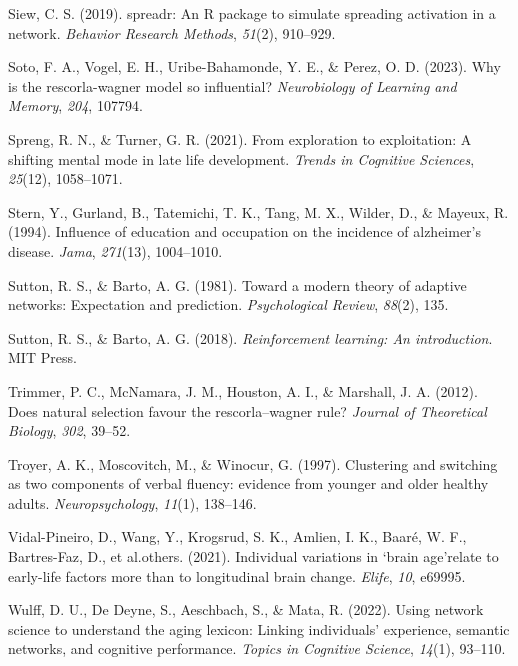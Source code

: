 \documentclass[
  man,floatsintext]{apa6}
\newlength{\cslhangindent}
\newlength{\cslentryspacingunit} %
\newenvironment{CSLReferences}[2] %
 {%
  \setlength{\parindent}{0pt}
  \ifodd #1
  \let\oldpar\par
  \def\par{\hangindent=\cslhangindent\oldpar}
  \fi
  \setlength{\parskip}{#2\cslentryspacingunit}
 }%
 {}
\begin{document}
\begin{CSLReferences}{1}{0}
\leavevmode{}%
Siew, C. S. (2019). {spreadr: An R package to simulate spreading activation in a network}. \emph{Behavior Research Methods}, \emph{51}(2), 910--929.

\leavevmode{}%
Soto, F. A., Vogel, E. H., Uribe-Bahamonde, Y. E., \& Perez, O. D. (2023). Why is the rescorla-wagner model so influential? \emph{Neurobiology of Learning and Memory}, \emph{204}, 107794.

\leavevmode{}%
Spreng, R. N., \& Turner, G. R. (2021). From exploration to exploitation: A shifting mental mode in late life development. \emph{Trends in Cognitive Sciences}, \emph{25}(12), 1058--1071.

\leavevmode{}%
Stern, Y., Gurland, B., Tatemichi, T. K., Tang, M. X., Wilder, D., \& Mayeux, R. (1994). Influence of education and occupation on the incidence of alzheimer's disease. \emph{Jama}, \emph{271}(13), 1004--1010.

\leavevmode{}%
Sutton, R. S., \& Barto, A. G. (1981). Toward a modern theory of adaptive networks: Expectation and prediction. \emph{Psychological Review}, \emph{88}(2), 135.

\leavevmode{}%
Sutton, R. S., \& Barto, A. G. (2018). \emph{Reinforcement learning: An introduction}. MIT Press.

\leavevmode{}%
Trimmer, P. C., McNamara, J. M., Houston, A. I., \& Marshall, J. A. (2012). Does natural selection favour the rescorla--wagner rule? \emph{Journal of Theoretical Biology}, \emph{302}, 39--52.

\leavevmode{}%
Troyer, A. K., Moscovitch, M., \& Winocur, G. (1997). {Clustering and switching as two components of verbal fluency: evidence from younger and older healthy adults.} \emph{Neuropsychology}, \emph{11}(1), 138--146.

\leavevmode{}%
Vidal-Pineiro, D., Wang, Y., Krogsrud, S. K., Amlien, I. K., Baaré, W. F., Bartres-Faz, D., et al.others. (2021). Individual variations in `brain age'relate to early-life factors more than to longitudinal brain change. \emph{Elife}, \emph{10}, e69995.

\leavevmode{}%
Wulff, D. U., De Deyne, S., Aeschbach, S., \& Mata, R. (2022). Using network science to understand the aging lexicon: Linking individuals' experience, semantic networks, and cognitive performance. \emph{Topics in Cognitive Science}, \emph{14}(1), 93--110.


\end{CSLReferences}
\end{document}
